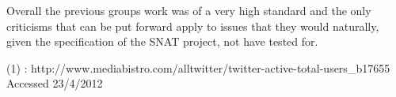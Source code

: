 Overall the previous groups work was of a very high standard and the only criticisms that can be put forward apply to issues that they would naturally, given the specification of the SNAT project, not have tested for.


(1) : http://www.mediabistro.com/alltwitter/twitter-active-total-users\_b17655 Accessed 23/4/2012
